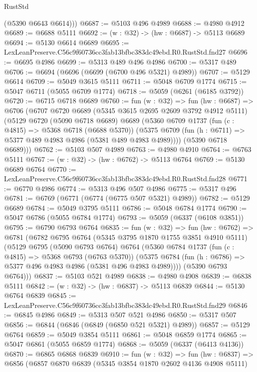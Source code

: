\begin{lexlean}{RustStd}
\begin{coremodule}
        (@5390 @6643 @6614)))
@6687 := @5103 @496 @4989
@6688 := @4980 @4912
@6689 := @6688 @5111
@6692 := (w : @32) -> (hw : @6687) -> @5113 @6689
@6694 := @5130 @6614 @6689
@6695 := LexLeanPreserve.C56c9f60736cc3fab13bfbc383dc49ebd.R0.RustStd.fnd27
@6696 := @6695 @4986
@6699 := @5313 @489 @496 @4986
@6700 := @5317 @489
@6706 := @6694 (@6696 (@6699 (@6700 @496 @5321) @4989))
@6707 := @5129 @6614
@6709 := @5049 @3615 @5111
@6711 := @5048 @6709 @1774
@6715 := @5047 @6711 (@5055 @6709 @1774)
@6718 := @5059 (@6261 (@6185 @3792))
@6720 := @6715 @6718 @6689
@6760 := fun (w : @32) =>
  fun (hw : @6687) =>
  @6706
    (@6707
      @6720
      @6689
      (@5345 @3615 @2695 @2609 @3792 @4912 @5111)
      (@5129
        @6720
        (@5090 @6718 @6689)
        @6689
        (@5360
          @6709
          @1737
          (fun (c : @4815) => @5368 @6718 (@6688 @5370))
          (@5375 @6709 (fun (h : @6711) => @5377 @489 @4983 @4986 (@5381 @489 @4983 @4989))))
        (@5390 @6718 @6689)))
@6762 := @5103 @507 @4989
@6763 := @4980 @4910
@6764 := @6763 @5111
@6767 := (w : @32) -> (hw : @6762) -> @5113 @6764
@6769 := @5130 @6689 @6764
@6770 := LexLeanPreserve.C56c9f60736cc3fab13bfbc383dc49ebd.R0.RustStd.fnd28
@6771 := @6770 @4986
@6774 := @5313 @496 @507 @4986
@6775 := @5317 @496
@6781 := @6769 (@6771 (@6774 (@6775 @507 @5321) @4989))
@6782 := @5129 @6689
@6784 := @5049 @3795 @5111
@6786 := @5048 @6784 @1774
@6790 := @5047 @6786 (@5055 @6784 @1774)
@6793 := @5059 (@6337 (@6108 @3851))
@6795 := @6790 @6793 @6764
@6835 := fun (w : @32) =>
  fun (hw : @6762) =>
  @6781
    (@6782
      @6795
      @6764
      (@5345 @3795 @1870 @1755 @3851 @4910 @5111)
      (@5129
        @6795
        (@5090 @6793 @6764)
        @6764
        (@5360
          @6784
          @1737
          (fun (c : @4815) => @5368 @6793 (@6763 @5370))
          (@5375 @6784 (fun (h : @6786) => @5377 @496 @4983 @4986 (@5381 @496 @4983 @4989))))
        (@5390 @6793 @6764)))
@6837 := @5103 @521 @4989
@6838 := @4980 @4908
@6839 := @6838 @5111
@6842 := (w : @32) -> (hw : @6837) -> @5113 @6839
@6844 := @5130 @6764 @6839
@6845 := LexLeanPreserve.C56c9f60736cc3fab13bfbc383dc49ebd.R0.RustStd.fnd29
@6846 := @6845 @4986
@6849 := @5313 @507 @521 @4986
@6850 := @5317 @507
@6856 := @6844 (@6846 (@6849 (@6850 @521 @5321) @4989))
@6857 := @5129 @6764
@6859 := @5049 @3854 @5111
@6861 := @5048 @6859 @1774
@6865 := @5047 @6861 (@5055 @6859 @1774)
@6868 := @5059 (@6337 (@6413 @4136))
@6870 := @6865 @6868 @6839
@6910 := fun (w : @32) =>
  fun (hw : @6837) =>
  @6856
    (@6857
      @6870
      @6839
      (@5345 @3854 @1870 @2602 @4136 @4908 @5111)

\end{coremodule}
\end{lexlean}
